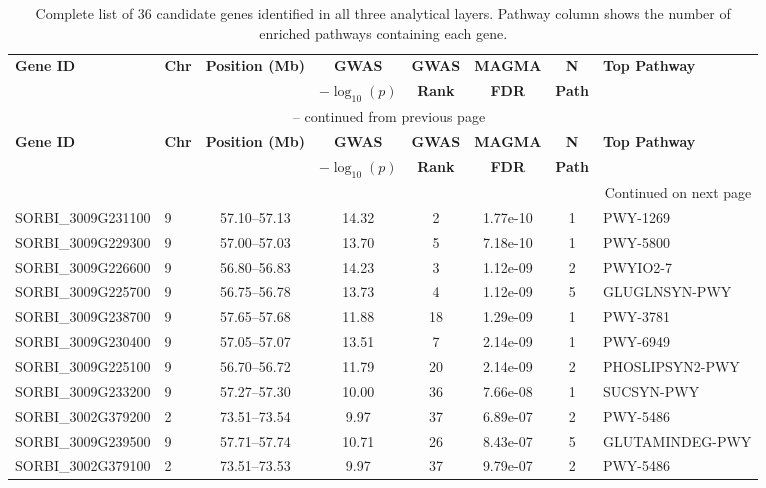 \documentclass[11pt]{article}
\begin{document}
\begin{longtable}{@{}llcccccl@{}}
\caption{Complete list of 36 candidate genes identified in all three analytical layers. Pathway column shows the number of enriched pathways containing each gene.} \label{tab:all_genes} \\
\toprule
\textbf{Gene ID} & \textbf{Chr} & \textbf{Position (Mb)} & \textbf{GWAS} & \textbf{GWAS} & \textbf{MAGMA} & \textbf{N} & \textbf{Top Pathway} \\
 & & & $-\log_{10}(p)$ & \textbf{Rank} & \textbf{FDR} & \textbf{Path} & \\
\midrule
\endfirsthead
\multicolumn{8}{c}{\tablename\ \thetable{} -- continued from previous page} \\
\toprule
\textbf{Gene ID} & \textbf{Chr} & \textbf{Position (Mb)} & \textbf{GWAS} & \textbf{GWAS} & \textbf{MAGMA} & \textbf{N} & \textbf{Top Pathway} \\
 & & & $-\log_{10}(p)$ & \textbf{Rank} & \textbf{FDR} & \textbf{Path} & \\
\midrule
\endhead
\midrule \multicolumn{8}{r}{Continued on next page} \\
\endfoot
\bottomrule
\endlastfoot
SORBI\_3009G231100 & 9 & 57.10--57.13 & 14.32 & 2 & 1.77e-10 & 1 & PWY-1269 \\
SORBI\_3009G229300 & 9 & 57.00--57.03 & 13.70 & 5 & 7.18e-10 & 1 & PWY-5800 \\
SORBI\_3009G226600 & 9 & 56.80--56.83 & 14.23 & 3 & 1.12e-09 & 2 & PWYIO2-7 \\
SORBI\_3009G225700 & 9 & 56.75--56.78 & 13.73 & 4 & 1.12e-09 & 5 & GLUGLNSYN-PWY \\
SORBI\_3009G238700 & 9 & 57.65--57.68 & 11.88 & 18 & 1.29e-09 & 1 & PWY-3781 \\
SORBI\_3009G230400 & 9 & 57.05--57.07 & 13.51 & 7 & 2.14e-09 & 1 & PWY-6949 \\
SORBI\_3009G225100 & 9 & 56.70--56.72 & 11.79 & 20 & 2.14e-09 & 2 & PHOSLIPSYN2-PWY \\
SORBI\_3009G233200 & 9 & 57.27--57.30 & 10.00 & 36 & 7.66e-08 & 1 & SUCSYN-PWY \\
SORBI\_3002G379200 & 2 & 73.51--73.54 & 9.97 & 37 & 6.89e-07 & 2 & PWY-5486 \\
SORBI\_3009G239500 & 9 & 57.71--57.74 & 10.71 & 26 & 8.43e-07 & 5 & GLUTAMINDEG-PWY \\
SORBI\_3002G379100 & 2 & 73.51--73.53 & 9.97 & 37 & 9.79e-07 & 2 & PWY-5486 \\

\end{longtable}
\end{document}
